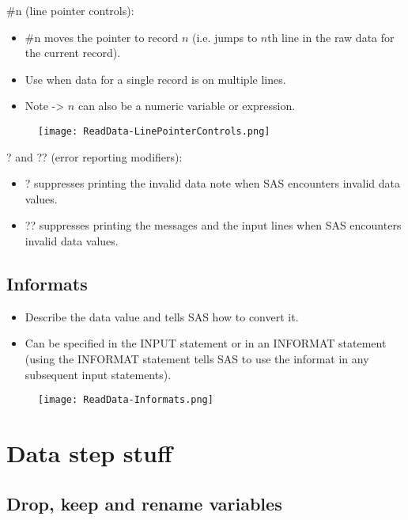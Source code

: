\documentclass[11pt, oneside]{article}
\begin{document}
\#n (line pointer controls):
\begin{itemize}
\item \#n moves the pointer to record $n$ (i.e. jumps to $n$th line in the raw data for the current record).
\item Use when data for a single record is on multiple lines.
\item Note -> $n$ can also be a numeric variable or expression.
\end{itemize}

\begin{figure}[H]
\texttt{[image: ReadData-LinePointerControls.png]}
\end{figure}

? and ?? (error reporting modifiers):
\begin{itemize}
\item ? suppresses printing the invalid data note when SAS encounters invalid data values.
\item ?? suppresses printing the messages and the input lines when SAS encounters invalid data values.
\end{itemize}

\subsection{Informats}

\begin{itemize}
\item Describe the data value and tells SAS how to convert it.
\item Can be specified in the INPUT statement or in an INFORMAT statement (using the INFORMAT statement tells SAS to use the informat in any subsequent input statements).
\end{itemize}

\begin{figure}[H]
\texttt{[image: ReadData-Informats.png]}
\end{figure}

\section{Data step stuff}

\subsection{Drop, keep and rename variables}
\end{document}
